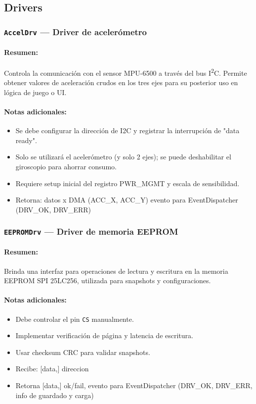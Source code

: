 \documentclass[11pt,a4paper]{article}
\begin{document}
\subsection{Drivers}

\subsubsection{\texttt{AccelDrv} — Driver de acelerómetro}
\paragraph{Resumen:} Controla la comunicación con el sensor MPU-6500 a través del bus I\textsuperscript{2}C. Permite obtener valores de aceleración crudos en los tres ejes para su posterior uso en lógica de juego o UI.
\paragraph{Notas adicionales:}
\begin{itemize}
  \item Se debe configurar la dirección de I2C y registrar la interrupción de "data ready".
  \item Solo se utilizará el acelerómetro (y solo 2 ejes); se puede deshabilitar el giroscopio para ahorrar consumo.
  \item Requiere setup inicial del registro PWR\_MGMT y escala de sensibilidad.
  \item Retorna: datos x DMA ({ACC\_X, ACC\_Y}) evento para EventDispatcher (DRV\_OK, DRV\_ERR)
\end{itemize}

\subsubsection{\texttt{EEPROMDrv} — Driver de memoria EEPROM}
\paragraph{Resumen:} Brinda una interfaz para operaciones de lectura y escritura en la memoria EEPROM SPI 25LC256, utilizada para snapshots y configuraciones.
\paragraph{Notas adicionales:}
\begin{itemize}
  \item Debe controlar el pin \texttt{CS} manualmente.
  \item Implementar verificación de página y latencia de escritura.
  \item Usar checksum CRC para validar snapshots.
  \item Recibe: [data,] direccion
  \item Retorna [data,] ok/fail, evento para EventDispatcher (DRV\_OK, DRV\_ERR, info de guardado y carga)
\end{itemize}
\end{document}

